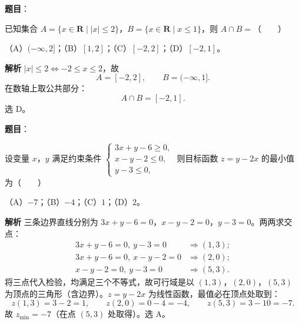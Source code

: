 
\begin{answer}

\textbf{题目}：

已知集合 $A=\{x\in\mathbf R\mid |x|\leqslant2\}$，$B=\{x\in\mathbf R\mid x\leqslant1\}$，则 $A\cap B=$\mbox{（　　）}

（A）$(-\infty,2]$；（B）$[1,2]$；（C）$[-2,2]$；（D）$[-2,1]$。

\textbf{解析}
$|x|\leqslant2\iff-2\leqslant x\leqslant2$，故
\nopagebreak[4]
\[A=[-2,2],\qquad B=(-\infty,1].\]
在数轴上取公共部分：
\nopagebreak[4]
\[A\cap B=[-2,1].\]
选 D。


\end{answer}
\begin{answer}

\textbf{题目}：

设变量 $x$，$y$ 满足约束条件 $\begin{cases}3x+y-6\geqslant0,\\ x-y-2\leqslant0,\\ y-3\leqslant0,\end{cases}$ 则目标函数 $z=y-2x$ 的最小值为\mbox{（　　）}

（A）$-7$；（B）$-4$；（C）$1$；（D）$2$。

\textbf{解析}
三条边界直线分别为 $3x+y-6=0$，$x-y-2=0$，$y-3=0$。两两求交点：
\nopagebreak[4]
\[\begin{aligned}
3x+y-6=0,\ y-3=0 &\Longrightarrow (1,3);\\
3x+y-6=0,\ x-y-2=0 &\Longrightarrow (2,0);\\
x-y-2=0,\ y-3=0 &\Longrightarrow (5,3).
\end{aligned}\]
将三点代入检验，均满足三个不等式，故可行域是以 $(1,3)$，$(2,0)$，$(5,3)$ 为顶点的三角形（含边界）。$z=y-2x$ 为线性函数，最值必在顶点处取到：
\nopagebreak[4]
\[z(1,3)=3-2=1,\qquad z(2,0)=0-4=-4,\qquad z(5,3)=3-10=-7.\]
故 $z_{\min}=-7$（在点 $(5,3)$ 处取得）。选 A。


\end{answer}
